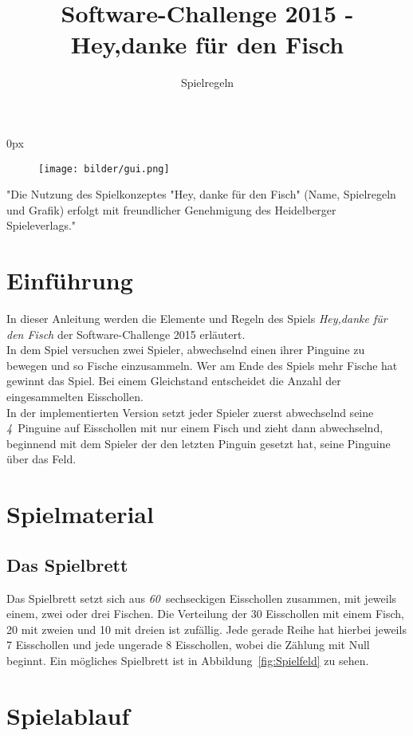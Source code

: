 \documentclass[a4paper, ngerman]{scrartcl}
\title{Software-Challenge 2015 - Hey,danke für den Fisch}
\subtitle{Spielregeln}
\newcommand{\FelderAnzahl}{\emph{60}}
\newcommand{\PinguinAnzahl}{\emph{4}}
\begin{document}
\parindent0px
\maketitle

\begin{figure}[h!]
	\centering
	\texttt{[image: bilder/gui.png]} 
\end{figure}
\vspace*{\fill}
"Die Nutzung des Spielkonzeptes "Hey, danke für den Fisch" (Name, Spielregeln
und Grafik) erfolgt mit freundlicher Genehmigung des Heidelberger
Spieleverlags."
\newpage
\tableofcontents
\newpage

\section{Einführung}
In dieser Anleitung werden die Elemente und Regeln des Spiels \emph{Hey,danke
für den Fisch} der Software-Challenge 2015 erläutert.\\
In dem Spiel versuchen zwei Spieler,
abwechselnd einen ihrer Pinguine zu bewegen und so Fische einzusammeln. Wer
am Ende des Spiels mehr Fische hat gewinnt das Spiel. Bei einem Gleichstand 
entscheidet die Anzahl der eingesammelten Eisschollen.\\
In der implementierten Version setzt jeder Spieler zuerst abwechselnd seine 
\PinguinAnzahl\ Pinguine auf Eisschollen mit nur einem Fisch und zieht dann
abwechselnd, beginnend mit dem Spieler der den letzten Pinguin gesetzt hat, seine Pinguine
über das Feld.

\section{Spielmaterial}
	\subsection{Das Spielbrett}
Das Spielbrett setzt sich aus \FelderAnzahl\ sechseckigen Eisschollen zusammen,
mit jeweils einem, zwei oder drei Fischen.
Die Verteilung der 30 Eisschollen mit einem Fisch, 20 mit zweien und 10 mit
dreien ist zufällig.
Jede gerade Reihe hat hierbei jeweils 7 Eisschollen und jede ungerade 8
Eisschollen, wobei die Zählung mit Null beginnt. Ein mögliches Spielbrett ist
in Abbildung~\ref{fig:Spielfeld} zu sehen.
\section{Spielablauf}	 
\end{document}
